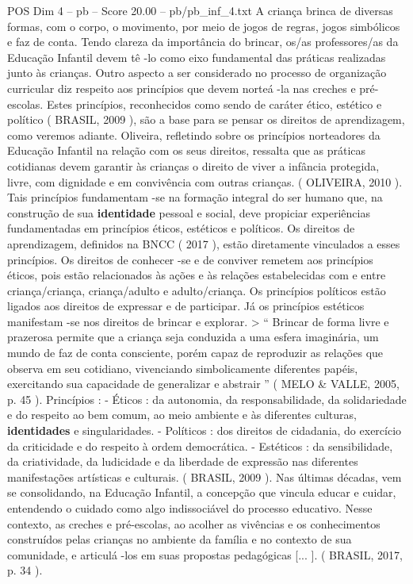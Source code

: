 \begin{textsample}{POS Dim 4 – pb – Score 20.00 – pb/pb\_inf\_4.txt}
A criança brinca de diversas formas, com o corpo, o movimento, por meio de jogos de regras, jogos simbólicos e faz de conta.
Tendo clareza da importância do brincar, os/as professores/as da Educação Infantil devem tê -lo como eixo fundamental das práticas realizadas junto às crianças.
Outro aspecto a ser considerado no processo de organização curricular diz respeito aos princípios que devem norteá -la nas creches e pré-escolas.
Estes princípios, reconhecidos como sendo de caráter ético, estético e político ( BRASIL, 2009 ), são a base para se pensar os direitos de aprendizagem, como veremos adiante.
Oliveira, refletindo sobre os princípios norteadores da Educação Infantil na relação com os seus direitos, ressalta que as práticas cotidianas devem garantir às crianças o direito de viver a infância protegida, livre, com dignidade e em convivência com outras crianças. ( OLIVEIRA, 2010 ).
Tais princípios fundamentam -se na formação integral do ser humano que, na construção de sua \textbf{identidade} pessoal e social, deve propiciar experiências fundamentadas em princípios éticos, estéticos e políticos.
Os direitos de aprendizagem, definidos na BNCC ( 2017 ), estão diretamente vinculados a esses princípios.
Os direitos de conhecer -se e de conviver remetem aos princípios éticos, pois estão relacionados às ações e às relações estabelecidas com e entre criança/criança, criança/adulto e adulto/criança.
Os princípios políticos estão ligados aos direitos de expressar e de participar.
Já os princípios estéticos manifestam -se nos direitos de brincar e explorar. > “ Brincar de forma livre e prazerosa permite que a criança seja conduzida a uma esfera imaginária, um mundo de faz de conta consciente, porém capaz de reproduzir as relações que observa em seu cotidiano, vivenciando simbolicamente diferentes papéis, exercitando sua capacidade de generalizar e abstrair ” ( MELO \& VALLE, 2005, p. 45 ).
Princípios : - Éticos : da autonomia, da responsabilidade, da solidariedade e do respeito ao bem comum, ao meio ambiente e às diferentes culturas, \textbf{identidades} e singularidades. - Políticos : dos direitos de cidadania, do exercício da criticidade e do respeito à ordem democrática. - Estéticos : da sensibilidade, da criatividade, da ludicidade e da liberdade de expressão nas diferentes manifestações artísticas e culturais. ( BRASIL, 2009 ).
Nas últimas décadas, vem se consolidando, na Educação Infantil, a concepção que vincula educar e cuidar, entendendo o cuidado como algo indissociável do processo educativo.
Nesse contexto, as creches e pré-escolas, ao acolher as vivências e os conhecimentos construídos pelas crianças no ambiente da família e no contexto de sua comunidade, e articulá -los em suas propostas pedagógicas [... ]. ( BRASIL, 2017, p. 34 ).

\end{textsample}
